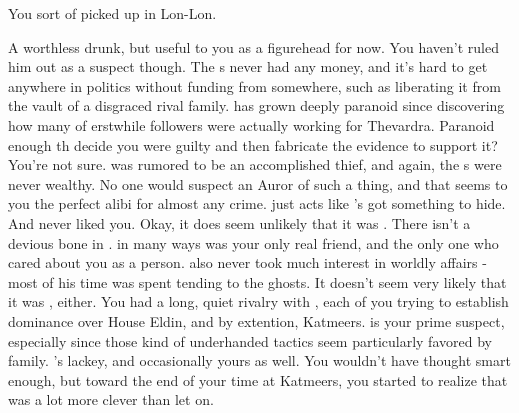 \documentclass[char]{Katmeers}
\begin{document}
\begin{itemz}[Notes]
	\item You sort of picked up \aAK{} in Lon-Lon.
\end{itemz}

\begin{contacts}
	\contact{\cRon{}}  A worthless drunk, but \cRon{\their} useful to you as a figurehead for now. You haven't ruled him out as a suspect though. The \cRon{\formal}s never had any money, and it's hard to get anywhere in politics without funding from somewhere, such as liberating it from the vault of a disgraced rival family.
	\contact{\cNeville{}} \cNeville{} has grown deeply paranoid since discovering how many of \cNeville{\their} erstwhile followers were actually working for Thevardra. Paranoid enough th decide you were guilty and then fabricate the evidence to support it? You're not sure.
	\contact{\cGinny{}} \cGinny{} was rumored to be an accomplished thief, and again, the \cGinny{\formal}s were never wealthy.
	\contact{\cHermione{}} No one would suspect an Auror of such a thing, and that seems to you the perfect alibi for almost any crime. \cHermione{} just acts like \cHermione{\they}'s got something to hide. And \cHermione{\they} never liked you.
	\contact{\cLuna{}} Okay, it does seem unlikely that it was \cLuna{}. There isn't a devious bone in \cLuna{\them}.
	\contact{\cCrabbe{}} in many ways \cCrabbe{} was your only real friend, and the only one who cared about you as a person. \cCrabbe{\They} also never took much interest in worldly affairs - most of his time was spent tending to the ghosts. It doesn't seem very likely that it was \cCrabbe{\them}, either.
	\contact{\cMalfoy{}} You had a long, quiet rivalry with \cMalfoy{\formal}, each of you trying to establish dominance over House Eldin, and by extention, Katmeers. \cMalfoy{\They} is your prime suspect, especially since those kind of underhanded tactics seem particularly favored by \cMalfoy{\their} family.
	\contact{\cGoyle{}} \cMalfoy{}'s lackey, and occasionally yours as well. You wouldn't have thought \cGoyle{\them} smart enough, but toward the end of your time at Katmeers, you started to realize that \cGoyle{\they} was a lot more clever than \cGoyle{\they} let on.
\end{contacts}
\end{document}
